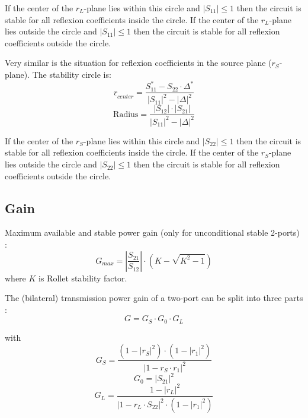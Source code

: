 If the center of the $r_L$-plane lies within this circle and $|S_{11}|
\le 1$ then the circuit is stable for all reflexion coefficients
inside the circle.  If the center of the $r_L$-plane lies outside the
circle and $|S_{11}| \le 1$ then the circuit is stable for all
reflexion coefficients outside the circle.

\addvspace{12pt}

Very similar is the situation for reflexion coefficients in the source
plane ($r_S$-plane).  The stability circle is:
\begin{equation}
\underline{r}_{center} = \frac{S_{11}^* - S_{22}\cdot \Delta^*}{|S_{11}|^2 - |\Delta|^2}
\end{equation}
\begin{equation}
\text{Radius} = \frac{|S_{12}|\cdot |S_{21}|}{|S_{11}|^2 - |\Delta|^2}
\end{equation}

If the center of the $r_S$-plane lies within this circle and $|S_{22}|
\le 1$ then the circuit is stable for all reflexion coefficients
inside the circle.  If the center of the $r_S$-plane lies outside the
circle and $|S_{22}| \le 1$ then the circuit is stable for all
reflexion coefficients outside the circle.

\subsection{Gain}

Maximum available and stable power gain (only for unconditional stable
2-ports) \cite{Michel1}:
\begin{equation}
G_{max} = \left| \frac{S_{21}}{S_{12}} \right| \cdot \left( K - \sqrt{K^2-1} \right)
\end{equation}
where $K$ is Rollet stability factor.

\addvspace{12pt}

The (bilateral) transmission power gain of a two-port can be split
into three parts \cite{Michel1}:
\begin{equation}
G = G_S \cdot G_0 \cdot G_L
\end{equation}

with
\begin{equation}
G_S = \frac{(1 - |r_S|^2) \cdot (1 - |r_1|^2)}{|1 - r_S\cdot r_1|^2}
\end{equation}
\begin{equation}
G_0 = |S_{21}|^2
\end{equation}
\begin{equation}
G_L = \frac{1 - |r_L|^2}{|1 - r_L\cdot S_{22}|^2 \cdot (1 - |r_1|^2)}
\end{equation}

